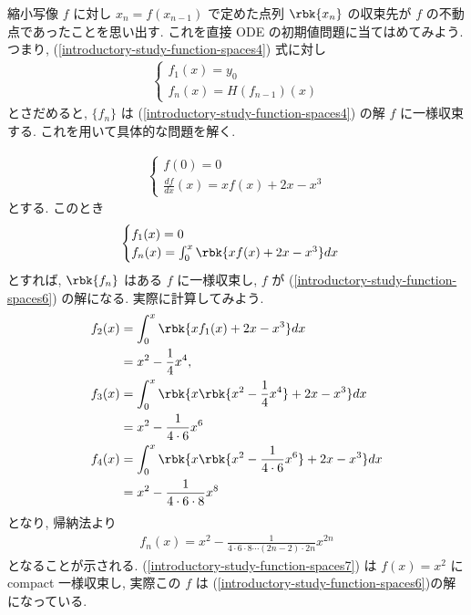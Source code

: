 \documentclass[openany, a4paper, oneside]{jsbook}
\begin{document}
\begin{ex}
縮小写像 $f$ に対し $x_n=f(x_{n - 1})$ で定めた点列 $\rbk{x_n}$ の収束先が $f$ の不動点であったことを思い出す.
これを直接 ODE の初期値問題に当てはめてみよう.
つまり, (\ref{introductory-study-function-spaces4}) 式に対し
\begin{align*}
 \begin{cases}
  f_1(x)
  =
  y_0 \\
  f_n(x)
  =
  H(f_{n - 1})(x)
 \end{cases}
\end{align*}
とさだめると,  $\{f_n\}$ は (\ref{introductory-study-function-spaces4}) の解 $f$ に一様収束する.
これを用いて具体的な問題を解く.

\begin{align}
 \begin{cases}
  f(0)
  =
  0 \\
  \frac{df}{dx}(x)
  =
  x f(x) + 2x - x^3
 \end{cases}\label{introductory-study-function-spaces6}
\end{align}
とする.
このとき
\begin{align*}
 \begin{cases}
  f_1(x)
  =
  0 \\
  f_n(x)
  =
  \int_{0}^{x} \rbk{x f(x) + 2x - x^3} dx
 \end{cases}
\end{align*}
とすれば,  $\rbk{f_n}$ はある $f$ に一様収束し,
$f$ が (\ref{introductory-study-function-spaces6}) の解になる.
実際に計算してみよう.
\begin{align*}
 f_2(x)
 &=
 \int_0^x \rbk{x f_1(x) + 2x - x^3} dx \\
 &=
 x^2 - \frac{1}{4} x^4, \\
 f_3(x)
 &=
 \int_0^x \rbk{x \rbk{x^2 - \frac{1}{4} x^4} + 2x - x^3} dx \\
 &=
 x^2 - \frac{1}{4 \cdot 6} x^6 \\
 f_4(x)
 &=
 \int_0^x \rbk{x \rbk{x^2 - \frac{1}{4 \cdot 6} x^6} + 2x - x^3} dx \\
 &=
 x^2 - \frac{1}{4 \cdot 6\cdot 8} x^8
\end{align*}
となり, 帰納法より
\begin{align}
 f_n(x)
 =
 x^2 - \frac{1}{4 \cdot 6 \cdot 8 \cdots (2n - 2) \cdot 2n} x^{2n} \label{introductory-study-function-spaces7}
\end{align}
となることが示される.
(\ref{introductory-study-function-spaces7}) は $f(x)=x^2$ に compact 一様収束し,
実際この $f$ は (\ref{introductory-study-function-spaces6})の解になっている.
\end{ex}
\end{document}
